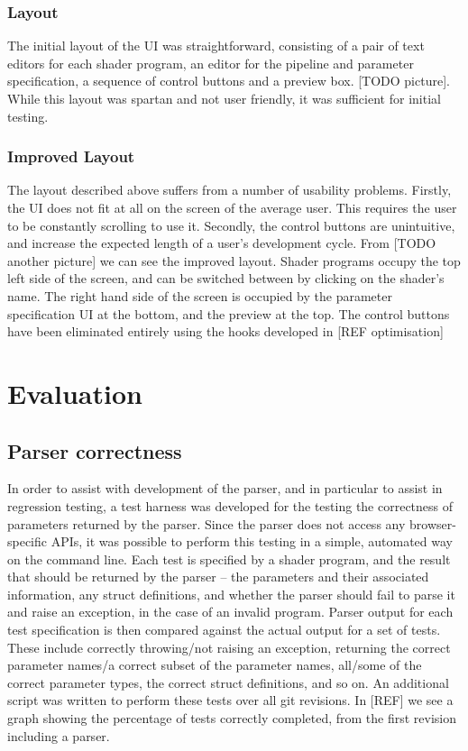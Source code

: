 \documentclass[12pt,twoside,notitlepage]{report}
\begin{document}
\subsection{Layout}
The initial layout of the UI was straightforward, consisting of a pair of text editors for each shader program, an editor for the pipeline and parameter specification, a sequence of control buttons and a preview box. [TODO picture]. While this layout was spartan and not user friendly, it was sufficient for initial testing.
\subsection{Improved Layout}
The layout described above suffers from a number of usability problems. Firstly, the UI does not fit at all on the screen of the average user. This requires the user to be constantly scrolling to use it. Secondly, the control buttons are unintuitive, and increase the expected length of a user's development cycle. From [TODO another picture] we can see the improved layout. Shader programs occupy the top left side of the screen, and can be switched between by clicking on the shader's name. The right hand side of the screen is occupied by the parameter specification UI at the bottom, and the preview at the top. The control buttons have been eliminated entirely using the hooks developed in [REF optimisation]

\cleardoublepage
\chapter{Evaluation}
\section{Parser correctness}
In order to assist with development of the parser, and in particular to assist in regression testing, a test harness was developed for the testing the correctness of parameters returned by the parser. Since the parser does not access any browser-specific APIs, it was possible to perform this testing in a simple, automated way on the command line. Each test is specified by a shader program, and the result that should be returned by the parser -- the parameters and their associated information, any struct definitions, and whether the parser should fail to parse it and raise an exception, in the case of an invalid program. Parser output for each test specification is then compared against the actual output for a set of tests. These include correctly throwing/not raising an exception, returning the correct parameter names/a correct subset of the parameter names, all/some of the correct parameter types, the correct struct definitions, and so on. An additional script was written to perform these tests over all git revisions. In [REF] we see a graph showing the percentage of tests correctly completed, from the first revision including a parser.
\end{document}

